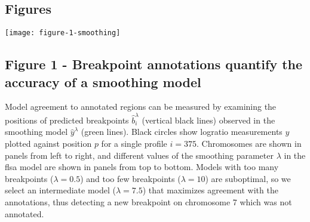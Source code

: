 \documentclass[10pt]{bmc_article}
\newcommand{\model}[1]{#1}
\newenvironment{bmcformat}{\begin{raggedright}\baselineskip20pt\sloppy\setboolean{publ}{false}}{\end{raggedright}\baselineskip20pt\sloppy}
\begin{document}
\begin{bmcformat}
 


{
  
 }     %





\newpage

\section*{Figures}

\texttt{[image: figure-1-smoothing]}

\subsection*{Figure 1 - Breakpoint annotations quantify the accuracy
  of a smoothing model}
Model agreement to annotated regions can be measured by examining the
positions of predicted breakpoints $\hat b_{i}^\lambda$ (vertical
black lines) observed in the smoothing model $\hat y^\lambda$ (green
lines).  Black circles show logratio measurements $y$ plotted against
position $p$ for a single profile $i=375$. Chromosomes are shown in
panels from left to right, and different values of the smoothing
parameter $\lambda$ in the \model{flsa} model are shown in panels from
top to bottom. Models with too many breakpoints ($\lambda=0.5$) and
too few breakpoints ($\lambda=10$) are suboptimal, so we select an
intermediate model ($\lambda=7.5$) that maximizes agreement with the
annotations, thus detecting a new breakpoint on chromosome 7 which was
not annotated.


\end{bmcformat}
\end{document}
